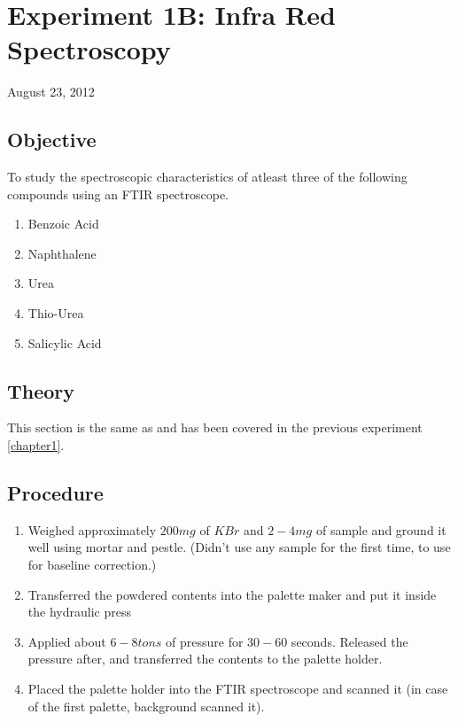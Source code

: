 \chapter{Experiment 1B: Infra Red Spectroscopy}
\begin{flushright}
August 23, 2012
\end{flushright}

\section{Objective}
	To study the spectroscopic characteristics of atleast three of the following compounds using an FTIR spectroscope.
	\begin{enumerate}
		\item Benzoic Acid
		\item Naphthalene
		\item Urea
		\item Thio-Urea
		\item Salicylic Acid
	\end{enumerate}

\section{Theory}
	This section is the same as and has been covered in the previous experiment \autoref{chapter1}.\\	

\section{Procedure}
	\begin{enumerate}
		\item Weighed approximately $200mg$ of $KBr$ and $2-4mg$ of sample and ground it well using mortar and pestle. (Didn't use any sample for the first time, to use for baseline correction.)
		\item Transferred the powdered contents into the palette maker and put it inside the hydraulic press
		\item Applied about $6-8tons$ of pressure for $30-60$ seconds. Released the pressure after, and transferred the contents to the palette holder.
		\item Placed the palette holder into the FTIR spectroscope and scanned it (in case of the first palette, background scanned it).
	\end{enumerate}

